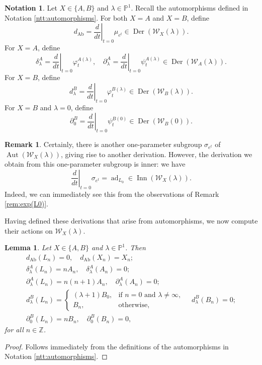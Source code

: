 \documentclass[11pt, svgnames]{amsart}
\DeclareMathOperator{\ad}{ad}
\newcommand{\ZZ}{\mathbb{Z}}
\newcommand{\PP}{\mathbb{P}}
\newcommand{\W}{\mathcal{W}}
\DeclareMathOperator{\Der}{Der}
\DeclareMathOperator{\Inn}{Inn}
\DeclareMathOperator{\Aut}{Aut}
\newcommand{\del}{\partial}
\newcommand{\diffeval}[2]{\left.\frac{d}{d#1}\right|_{#1=#2}}
\DeclareMathOperator{\Ab}{Ab}
\newtheorem{lemma}[proposition]{Lemma}
\theoremstyle{definition}
\newtheorem{Notation}[proposition]{Notation}
\newtheorem{remark}[proposition]{Remark}
\begin{document}
\begin{Notation}\label{ntt:derivations}
    Let $X \in \{A,B\}$ and $\lambda \in \PP^1$. Recall the automorphisms defined in Notation \ref{ntt:automorphisms}. For both $X = A$ and $X = B$, define
    $$d_{\Ab} = \diffeval{t}{0}\mu_{e^t} \in \Der(\W_X(\lambda)).$$
    For $X = A$, define
    $$\delta_\lambda^A = \diffeval{t}{0}\varphi_t^{A(\lambda)}, \quad \del_\lambda^A = \diffeval{t}{0}\psi_t^{A(\lambda)} \in \Der(\W_A(\lambda)).$$
    For $X = B$, define
    $$d_\lambda^B = \diffeval{t}{0}\varphi_t^{B(\lambda)} \in \Der(\W_B(\lambda)).$$
    For $X = B$ and $\lambda = 0$, define
    $$\del^B_0 = \diffeval{t}{0}\psi_t^{B(0)} \in \Der(\W_B(0)).$$
\end{Notation}

\begin{remark}
    Certainly, there is another one-parameter subgroup $\sigma_{e^t}$ of $\Aut(\W_X(\lambda))$, giving rise to another derivation. However, the derivation we obtain from this one-parameter subgroup is inner: we have
    $$\diffeval{t}{0}\sigma_{e^t} = \ad_{L_0} \in \Inn(\W_X(\lambda)).$$
    Indeed, we can immediately see this from the observations of Remark \ref{rem:exp(L0)}.
\end{remark}

Having defined these derivations that arise from automorphisms, we now compute their actions on $\W_X(\lambda)$.

\begin{lemma}\label{lem:derivations}
    Let $X \in \{A,B\}$ and $\lambda \in \PP^1$. Then
    $$\begin{gathered}
        d_{\Ab}(L_n) = 0, \quad d_{\Ab}(X_n) = X_n; \\
        \delta_\lambda^A(L_n) = nA_n, \quad \delta_\lambda^A(A_n) = 0; \\
        \del_\lambda^A(L_n) = n(n + 1)A_n, \quad \del_\lambda^A(A_n) = 0; \\
        d_{\lambda}^B(L_n) = \begin{cases}
        (\lambda + 1)B_0, &\text{if } n = 0 \text{ and } \lambda \neq \infty,\\
        B_n, &\text{otherwise},
    \end{cases} \quad d_{\lambda}^B(B_n) = 0; \\
    \del^B_0(L_n) = nB_n, \quad \del^B_0(B_n) = 0,
    \end{gathered}$$
    for all $n \in \ZZ$.
\end{lemma}
\begin{proof}
    Follows immediately from the definitions of the automorphisms in Notation \ref{ntt:automorphisms}.
\end{proof}
\end{document}
